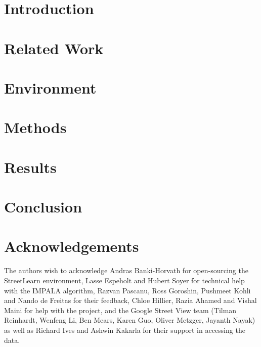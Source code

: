 \documentclass{article}
\begin{document}
\section{Introduction}
\label{sec:intro}


\section{Related Work}
\label{sec:related}


\section{Environment}
\label{sec:environment}


\section{Methods}
\label{sec:methods}


\section{Results}
\label{sec:experiments}


\section{Conclusion}
\label{sec:conclusion}


\section*{Acknowledgements}

The authors wish to acknowledge Andras Banki-Horvath for open-sourcing the StreetLearn environment, Lasse Espeholt and Hubert Soyer for technical help with the IMPALA algorithm, Razvan Pascanu, Ross Goroshin, Pushmeet Kohli and Nando de Freitas for their feedback, Chloe Hillier, Razia Ahamed and Vishal Maini for help with the project, and the Google Street View team (Tilman Reinhardt, Wenfeng Li, Ben Mears, Karen Guo, Oliver Metzger, Jayanth Nayak) as well as Richard Ives and Ashwin Kakarla for their support in accessing the data.




\newpage
\appendix{}
\end{document}
